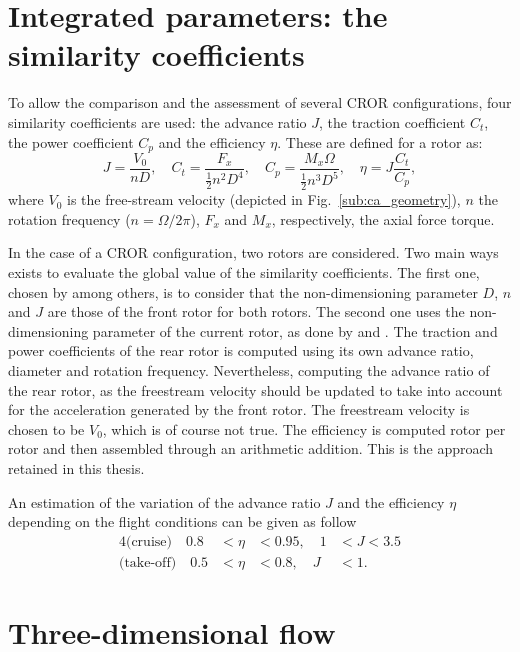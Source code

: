 \section{Integrated parameters: the similarity coefficients}
\label{sec:ca_similarity_coeff}

To allow the comparison and the assessment of several
CROR configurations, four similarity coefficients are used:
the advance ratio $J$, the traction coefficient $C_t$, 
the power coefficient $C_p$ and the efficiency $\eta$.
These are defined for a rotor as:
\begin{equation}
    J = \frac{V_0}{n D}, \quad
    C_t = \frac{F_x}{\frac{1}{2} n ^ 2  D ^ 4}, \quad
    C_p = \frac{M_x \Omega}{\frac{1}{2} n ^ 3 D ^ 5}, \quad
    \eta = J \frac{C_t}{C_p},
\end{equation}
where $V_0$ is the free-stream velocity (depicted in Fig.~\ref{sub:ca_geometry}), 
$n$ the rotation frequency ($n = \Omega / 2 \pi$), 
$F_x$ and $M_x$, respectively, the axial force torque.

In the case of a CROR configuration, two rotors are considered.
Two main ways exists to evaluate the global value of the
similarity coefficients. The first one, chosen by
\citet{Bechet2011} among others, is to consider
that the non-dimensioning parameter $D$, $n$ and $J$ are those
of the front rotor for both rotors. 
The second one uses the non-dimensioning parameter of the current rotor,
as done by \citet{Stuermer2008} and \citet{Zachariadis2011}.
The traction and power coefficients of the rear rotor is
computed using its own advance ratio, diameter and rotation frequency.
Nevertheless, computing the advance ratio of the rear rotor, as
the freestream velocity should be updated to take into account
for the acceleration generated by the front rotor. The freestream
velocity is chosen to be $V_0$, which is of course not true.
The efficiency is computed rotor per rotor and then
assembled through an arithmetic addition. This is the approach retained
in this thesis.

An estimation of the variation of the advance ratio $J$ and the 
efficiency $\eta$ depending on the flight conditions can be given as follow
\begin{alignat}{4}
    \text{(cruise)} \quad  0.8 &< \eta &< 0.95, \quad 1 &< J < 3.5 \\
    \text{(take-off)} \quad  0.5 &< \eta &< 0.8, \quad J &< 1.
\end{alignat}

\section{Three-dimensional flow}
\label{sec:ca_3D_flow}




